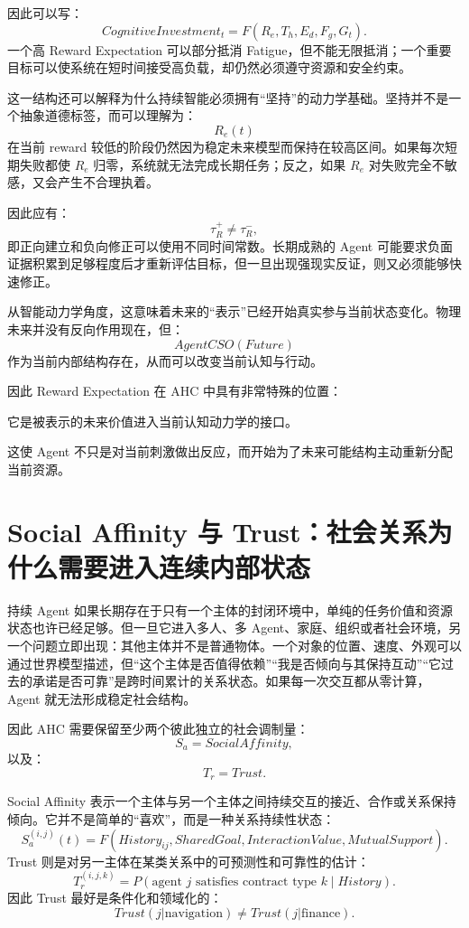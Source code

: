 因此可以写：
\[
CognitiveInvestment_t
=
F(
R_e,
T_h,
E_d,
F_g,
G_t
).
\]
一个高 Reward Expectation 可以部分抵消 Fatigue，但不能无限抵消；一个重要目标可以使系统在短时间接受高负载，却仍然必须遵守资源和安全约束。

这一结构还可以解释为什么持续智能必须拥有“坚持”的动力学基础。坚持并不是一个抽象道德标签，而可以理解为：
\[
R_e(t)
\]
在当前 reward 较低的阶段仍然因为稳定未来模型而保持在较高区间。如果每次短期失败都使 \(R_e\) 归零，系统就无法完成长期任务；反之，如果 \(R_e\) 对失败完全不敏感，又会产生不合理执着。

因此应有：
\[
\tau_R^{+}
\neq
\tau_R^{-},
\]
即正向建立和负向修正可以使用不同时间常数。长期成熟的 Agent 可能要求负面证据积累到足够程度后才重新评估目标，但一旦出现强现实反证，则又必须能够快速修正。

从智能动力学角度，这意味着未来的“表示”已经开始真实参与当前状态变化。物理未来并没有反向作用现在，但：
\[
AgentCSO(Future)
\]
作为当前内部结构存在，从而可以改变当前认知与行动。

因此 Reward Expectation 在 AHC 中具有非常特殊的位置：
\begin{statementbox}
它是被表示的未来价值进入当前认知动力学的接口。
\end{statementbox}
这使 Agent 不只是对当前刺激做出反应，而开始为了未来可能结构主动重新分配当前资源。

\section{Social Affinity 与 Trust：社会关系为什么需要进入连续内部状态}

持续 Agent 如果长期存在于只有一个主体的封闭环境中，单纯的任务价值和资源状态也许已经足够。但一旦它进入多人、多 Agent、家庭、组织或者社会环境，另一个问题立即出现：其他主体并不是普通物体。一个对象的位置、速度、外观可以通过世界模型描述，但“这个主体是否值得依赖”“我是否倾向与其保持互动”“它过去的承诺是否可靠”是跨时间累计的关系状态。如果每一次交互都从零计算，Agent 就无法形成稳定社会结构。

因此 AHC 需要保留至少两个彼此独立的社会调制量：
\[
S_a
=
SocialAffinity,
\]
以及：
\[
T_r
=
Trust.
\]

Social Affinity 表示一个主体与另一个主体之间持续交互的接近、合作或关系保持倾向。它并不是简单的“喜欢”，而是一种关系持续性状态：
\[
S_a^{(i,j)}(t)
=
F(
History_{ij},
SharedGoal,
InteractionValue,
MutualSupport
).
\]
Trust 则是对另一主体在某类关系中的可预测性和可靠性的估计：
\[
T_r^{(i,j,k)}
=
P(
\text{agent }j
\text{ satisfies contract type }k
\mid
History
).
\]
因此 Trust 最好是条件化和领域化的：
\[
Trust(j|\mathrm{navigation})
\neq
Trust(j|\mathrm{finance}).
\]

